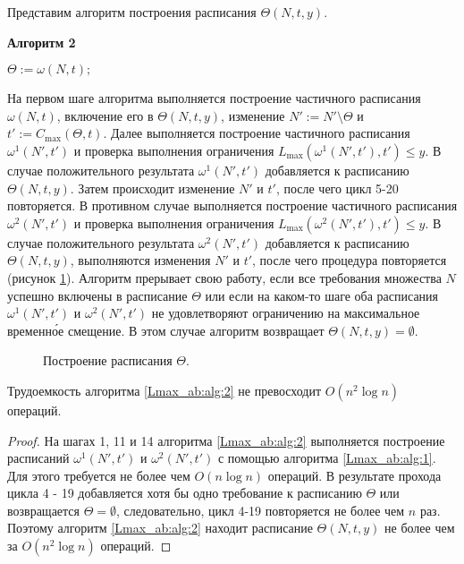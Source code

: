 Представим алгоритм построения расписания $\Theta(N, t, y)$.
\begin{algorithm}[H]
\NoCaptionOfAlgo
\caption{\textbf{Алгоритм 2}\label{Lmax_ab:alg:2}}
\small
\SetAlgoLined
{}
$\Theta:=\omega(N,t);$\\
\end{algorithm}
\normalsize
На первом шаге алгоритма выполняется построение частичного расписания $\omega(N,t)$, включение его в $\Theta(N,t,y)$, изменение $N':=N' \setminus \Theta$ и $t':=C_{\max}(\Theta,t)$. Далее выполняется построение частичного расписания $\omega^1(N',t')$ и проверка выполнения ограничения $L_{\max} (\omega^1(N',t'),t') \leq y$. В случае положительного результата $\omega^1(N',t')$ добавляется к расписанию $\Theta(N,t,y)$. Затем происходит изменение $N'$ и $t'$, после чего цикл 5-20 повторяется. В противном случае выполняется построение частичного расписания $\omega^2(N',t')$ и проверка выполнения ограничения $L_{\max} (\omega^2(N',t'),t') \leq y$. В случае положительного результата $\omega^2(N',t')$ добавляется к расписанию $\Theta(N,t,y)$, выполняются изменения $N'$ и $t'$, после чего процедура повторяется (рисунок \ref{Lmax_ab:ris:3}). Алгоритм прерывает свою работу, если все требования множества $N$ успешно включены в расписание $\Theta$ или если на каком-то шаге оба расписания $\omega^1(N', t')$ и $\omega^2(N', t')$ не удовлетворяют ограничению на максимальное временн\'{о}е смещение. В этом случае алгоритм возвращает $\Theta(N,t,y) = \emptyset$.

\begin{figure}[h!]
\caption{Построение расписания $\Theta$.}
\label{Lmax_ab:ris:3}
\end{figure}

\begin{lemma}\label{Lmax_ab:lm:4}
Трудоемкость алгоритма \ref{Lmax_ab:alg:2} не превосходит $O(n^2 \log n)$ операций.
\end{lemma}
\begin{proof}
На шагах 1, 11 и 14 алгоритма \ref{Lmax_ab:alg:2} выполняется построение расписаний $\omega^1(N', t')$ и $\omega^2(N', t')$ с помощью алгоритма \ref{Lmax_ab:alg:1}. Для этого требуется не более чем $O(n \log n)$ операций. В результате прохода цикла 4 - 19 добавляется хотя бы одно требование к расписанию $\Theta$ или возвращается $\Theta = \emptyset$, следовательно, цикл 4-19 повторяется не более чем $n$ раз. Поэтому алгоритм \ref{Lmax_ab:alg:2} находит расписание $\Theta(N, t, y)$ не более чем за $O(n^2 \log n)$ операций.
\end{proof}

